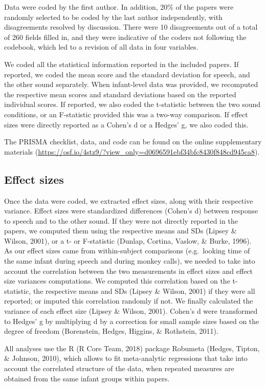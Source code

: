 \documentclass[man]{apa6}
\begin{document}
Data were coded by the first author. In addition, 20\% of the papers
were randomly selected to be coded by the last author independently,
with disagreements resolved by discussion. There were 10 disagreements
out of a total of 260 fields filled in, and they were indicative of the
coders not following the codebook, which led to a revision of all data
in four variables.

We coded all the statistical information reported in the included
papers. If reported, we coded the mean score and the standard deviation
for speech, and the other sound separately. When infant-level data was
provided, we recomputed the respective mean scores and standard
deviations based on the reported individual scores. If reported, we also
coded the t-statistic between the two sound conditions, or an
F-statistic provided this was a two-way comparison. If effect sizes were
directly reported as a Cohen's d or a Hedges' g, we also coded this.

The PRISMA checklist, data, and code can be found on the online
supplementary materials
(\url{https://osf.io/4stz9/?view_only=d0696591ebf34bfc8430f848cd945ca8}).

\subsection{Effect sizes}\label{effect-sizes}

Once the data were coded, we extracted effect sizes, along with their
respective variance. Effect sizes were standardized differences (Cohen's
d) between response to speech and to the other sound. If they were not
directly reported in the papers, we computed them using the respective
means and SDs (Lipsey \& Wilson, 2001), or a t- or F-statistic (Dunlap,
Cortina, Vaslow, \& Burke, 1996). As our effect sizes came from
within-subject comparisons (e.g.~looking time of the same infant during
speech and during monkey calls), we needed to take into account the
correlation between the two measurements in effect sizes and effect size
variances computations. We computed this correlation based on the
t-statistic, the respective means and SDs (Lipsey \& Wilson, 2001) if
they were all reported; or imputed this correlation randomly if not. We
finally calculated the variance of each effect size (Lipsey \& Wilson,
2001). Cohen's d were transformed to Hedges' g by multiplying d by a
correction for small sample sizes based on the degree of freedom
(Borenstein, Hedges, Higgins, \& Rothstein, 2011).

All analyses use the R (R Core Team, 2018) package Robumeta (Hedges,
Tipton, \& Johnson, 2010), which allows to fit meta-analytic regressions
that take into account the correlated structure of the data, when
repeated measures are obtained from the same infant groups within
papers.
\end{document}
